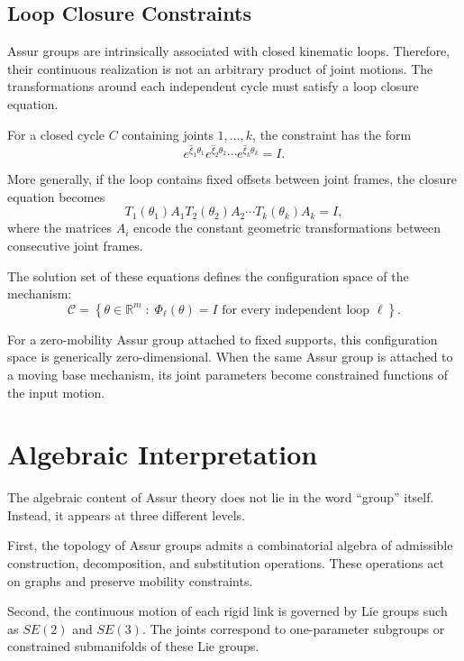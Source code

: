 \documentclass[12pt,a4paper]{article}
\begin{document}
\subsection{Loop Closure Constraints}

Assur groups are intrinsically associated with closed kinematic loops. Therefore, their continuous realization is not an arbitrary product of joint motions. The transformations around each independent cycle must satisfy a loop closure equation.

For a closed cycle $C$ containing joints $1,\dots,k$, the constraint has the form
\begin{equation}
e^{\hat{\xi}_1 \theta_1}
e^{\hat{\xi}_2 \theta_2}
\cdots
e^{\hat{\xi}_k \theta_k}
=
I.
\end{equation}

More generally, if the loop contains fixed offsets between joint frames, the closure equation becomes
\begin{equation}
T_1(\theta_1)A_1
T_2(\theta_2)A_2
\cdots
T_k(\theta_k)A_k
=
I,
\end{equation}
where the matrices $A_i$ encode the constant geometric transformations between consecutive joint frames.

The solution set of these equations defines the configuration space of the mechanism:
\begin{equation}
\mathcal{C}
=
\left\{
\theta \in \mathbb{R}^m
\;:\;
\Phi_\ell(\theta) = I
\text{ for every independent loop } \ell
\right\}.
\end{equation}

For a zero-mobility Assur group attached to fixed supports, this configuration space is generically zero-dimensional. When the same Assur group is attached to a moving base mechanism, its joint parameters become constrained functions of the input motion.

\section{Algebraic Interpretation}

The algebraic content of Assur theory does not lie in the word ``group'' itself. Instead, it appears at three different levels.

First, the topology of Assur groups admits a combinatorial algebra of admissible construction, decomposition, and substitution operations. These operations act on graphs and preserve mobility constraints.

Second, the continuous motion of each rigid link is governed by Lie groups such as $SE(2)$ and $SE(3)$. The joints correspond to one-parameter subgroups or constrained submanifolds of these Lie groups.
\end{document}
